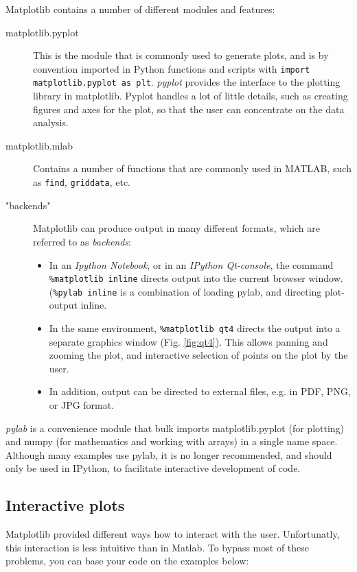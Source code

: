 Matplotlib contains a number of different modules and features:
\begin{description}
  \item[matplotlib.pyplot] This is the module that is commonly used to generate plots, and is by convention imported in Python functions and scripts with \lstinline{import matplotlib.pyplot as plt}. \emph{pyplot}  provides the interface to the plotting library in matplotlib. Pyplot handles a lot of little details, such as creating figures and axes for the plot, so that the user can concentrate on the data analysis.
  \item[matplotlib.mlab] Contains a number of functions that are commonly used in MATLAB, such as \lstinline{find}, \lstinline{griddata}, etc.
  \item["backends"] Matplotlib can produce output in many different formats, which are referred to as \emph{backends}:
    \begin{itemize}
      \item In an \emph{Ipython Notebook}, or in an \emph{IPython Qt-console}, the command \lstinline{%matplotlib inline} directs output into the current browser window. (\lstinline{%pylab inline} is a combination of loading pylab, and directing plot-output inline.
      \item In the same environment, \lstinline{%matplotlib qt4} directs the output into a separate graphics window (Fig. \ref{fig:qt4}). This allows panning and zooming the plot, and interactive selection of points on the plot by the user.
      \item In addition, output can be directed to external files, e.g. in PDF, PNG, or JPG format.
    \end{itemize}
\end{description}

\emph{pylab} is a convenience module that bulk imports matplotlib.pyplot (for plotting) and numpy (for mathematics and working with arrays) in a single name space. Although many examples use pylab, it is no longer recommended, and should only be used in IPython, to facilitate interactive development of code.

\subsection{Interactive plots}

Matplotlib provided different ways how to interact with the user. Unfortunatly, this interaction is less intuitive than in Matlab. To bypass most of these problems, you can base your code on the examples below:

